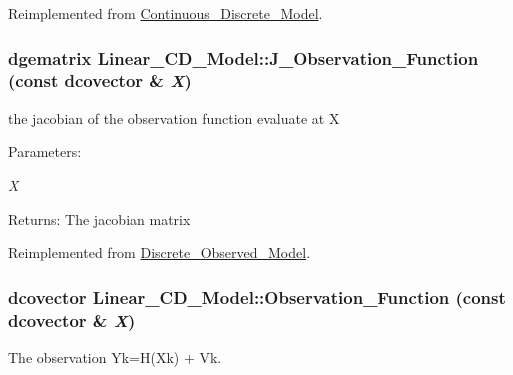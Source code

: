 Reimplemented from \hyperlink{class_continuous___discrete___model_634d515a19cc782505935c8f23b00fff}{Continuous\_\-Discrete\_\-Model}.\hypertarget{class_linear___c_d___model_6188317af5df5b7d495f84256bb1c75a}{
\subsubsection[{J\_\-Observation\_\-Function}]{\setlength{\rightskip}{0pt plus 5cm}dgematrix Linear\_\-CD\_\-Model::J\_\-Observation\_\-Function (const dcovector \& {\em X})}}
\label{class_linear___c_d___model_6188317af5df5b7d495f84256bb1c75a}


the jacobian of the observation function evaluate at X 

\begin{Desc}
\item[Parameters:]
\begin{description}
\item[{\em X}]\end{description}
\end{Desc}
\begin{Desc}
\item[Returns:]The jacobian matrix \end{Desc}


Reimplemented from \hyperlink{class_discrete___observed___model_83cd1f2f54544d8977dbce844031f85e}{Discrete\_\-Observed\_\-Model}.\hypertarget{class_linear___c_d___model_79ddecd171ea3725ed37ea689e53bf96}{
\subsubsection[{Observation\_\-Function}]{\setlength{\rightskip}{0pt plus 5cm}dcovector Linear\_\-CD\_\-Model::Observation\_\-Function (const dcovector \& {\em X})}}
\label{class_linear___c_d___model_79ddecd171ea3725ed37ea689e53bf96}


The observation Yk=H(Xk) + Vk. 

